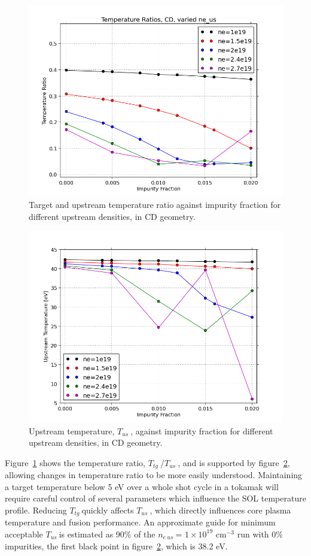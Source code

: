 \documentclass[12pt]{article}  %
\providecommand{\noNe}[1]{{${#1}\times 10^{19}$ cm$^{-3}$}} %
\providecommand{\neus}{$n_{e~us}~$} %
\providecommand{\Tus}{$T_{us}~$} %
\providecommand{\Ttg}{$T_{tg}~$} %
\begin{document}
\begin{figure}
\includegraphics[scale=0.5]{Figures/sol1d/CvarTR5nes.png}
\centering
\caption{Target and upstream temperature ratio against impurity fraction for different upstream densities, in CD geometry.}\label{figCvarTR5nes}
\end{figure}

\begin{figure}
\includegraphics[scale=0.5]{Figures/sol1d/CvarTus.png}
\centering
\caption{Upstream temperature, \Tus, against impurity fraction for different upstream densities, in CD geometry.}\label{figCvarTus}
\end{figure}

Figure~\ref{figCvarTR5nes} shows the temperature ratio, \Ttg/\Tus, and is supported by figure~\ref{figCvarTus}, allowing changes in temperature ratio to be more easily understood. Maintaining a target temperature below 5 eV over a whole shot cycle in a tokamak will require careful control of several parameters which influence the SOL temperature profile. Reducing \Ttg quickly affects \Tus, which directly influences core plasma temperature and fusion performance. An approximate guide for minimum acceptable \Tus is estimated as 90\% of the \neus = \noNe{1} run with 0\% impurities, the first black point in figure~\ref{figCvarTus}, which is 38.2 eV. 
\end{document}
